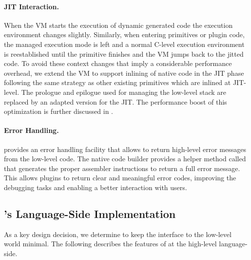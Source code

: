 \paragraph{JIT Interaction.}

When the \PH VM starts the execution of dynamic generated code the execution environment changes slightly.
Similarly, when entering primitives or plugin code, the managed execution mode is left and a normal C-level execution environment is reestablished until the primitive finishes and the VM jumps back to the jitted code. 
To avoid these context changes that imply a considerable performance overhead, we extend the VM to support inlining of native code in the JIT phase following the same strategy as other existing primitives which are inlined at JIT-level.
The \B prologue and epilogue used for managing the low-level stack are replaced by an adapted version for the JIT.
The performance boost of this optimization is further discussed in .

\paragraph{Error Handling.}


\B provides an error handling facility that allows to return high-level error messages from the low-level code. 
The native code builder provides a helper method called  
that generates the proper assembler instructions to return a full error message.
This allows plugins to return clear and meaningful error codes, improving the debugging tasks and enabling a better interaction with users.

\subsection{\B's Language-Side Implementation}
As a key design decision, we determine to keep the interface to the low-level world minimal.
The following describes the features of \B at the high-level language-side.

